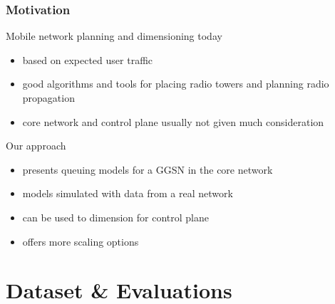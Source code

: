 \documentclass{beamer}
\begin{document}
\begin{frame}
    \frametitle{Motivation}



	Mobile network planning and dimensioning today
    \begin{itemize}
    	\item based on expected user traffic
		\item good algorithms and tools for placing radio towers and planning radio propagation
		\item core network and control plane usually not given much consideration
	\end{itemize}

	Our approach
	\begin{itemize}
		\item presents queuing models for a GGSN in the core network
		\item models simulated with data from a real network
		\item can be used to dimension for control plane
		\item offers more scaling options
	\end{itemize}

\end{frame}

\section{Dataset \& Evaluations}
\end{document}
